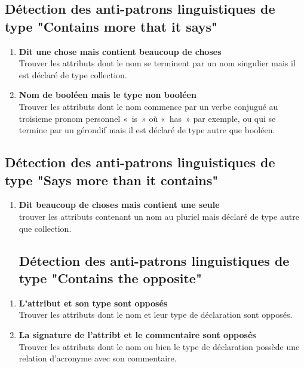 \subsection{Détection des anti-patrons linguistiques de type "Contains more that it says"}
\begin{enumerate}
    \item \textbf{Dit une chose mais contient beaucoup de choses}\\
    Trouver les attributs dont le nom se terminent par un nom singulier mais il est déclaré de type collection.
\item \textbf{Nom de booléen mais le type non booléen}\\
Trouver les attributs dont le nom  commence par  un verbe conjugué au troisieme pronom personnel « is » où « has » par exemple, ou qui se termine par un gérondif mais il est déclaré de type autre que booléen.
\end{enumerate}
\subsection{Détection des anti-patrons linguistiques de type "Says more than it contains"}
\begin{enumerate}
    

\item \textbf{Dit beaucoup de choses mais contient une seule}\\
trouver les attributs contenant un nom au pluriel mais déclaré de type autre que collection.
\subsection{Détection des anti-patrons linguistiques de type "Contains the opposite"}
\end{enumerate}
\begin{enumerate}
    

\item \textbf{L'attribut et son type sont opposés}\\
Trouver les attributs dont le nom et leur type de déclaration sont opposés.
\item \textbf{ La signature de l’attribt et le commentaire sont opposés}
\\Trouver les attributs dont le nom ou bien le type de déclaration possède une relation d’acronyme avec son commentaire.
\end{enumerate}

